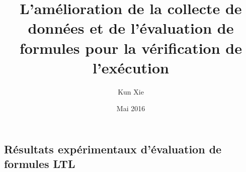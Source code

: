 \documentclass[times,twoside,memoire]{uqac-these}
\theoremstyle{definition}
\newcommand{\UqacTheseTitre}{L'amélioration de la collecte de données et de l'évaluation de formules pour la vérification de l'exécution}
\newcommand{\UqacTheseAuteur}{Kun Xie}
\newcommand{\UqacTheseDate}{Mai 2016}
\begin{document}
  
\title{\UqacTheseTitre}
\author{\UqacTheseAuteur}
\date{\UqacTheseDate}
\thispagestyle{empty}
\maketitle

\frontmatter

\doublespacing




\singlespacing
\cleardoublepage
\label{\contentsname}
\tableofcontents
\newpage

\label{\listfigurename}
\listoffigures
\newpage

\label{\listtablename}
\listoftables
\newpage

\mainmatter
\doublespacing







% 

\begin{appendices}
\renewcommand\chaptername{Appendix}
\chapter{Résultats expérimentaux d'évaluation de formules LTL}
\label{appendixa}

\end{appendices}

\backmatter
% 

\clearpage
{}



\end{document}
